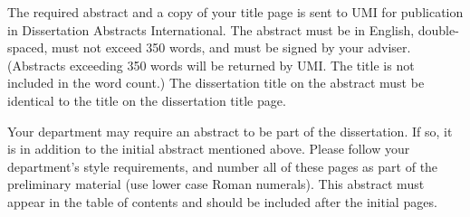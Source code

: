 
The required abstract and a copy of your title page is sent to UMI for
publication in Dissertation Abstracts International.  The abstract must be
in English, double-spaced, must not exceed 350 words, and must be signed by
your adviser.  (Abstracts exceeding 350 words will be returned by UMI.  The
title is not included in the word count.) The dissertation title on the
abstract must be identical to the title on the dissertation title page.



Your department may require an abstract to be part of the dissertation.  If
so, it is in addition to the initial abstract mentioned above.  Please follow your
department's style requirements, and number all of these pages as part of
the preliminary material (use lower case Roman numerals).  This abstract
must appear in the table of contents and should be included after the initial pages.

